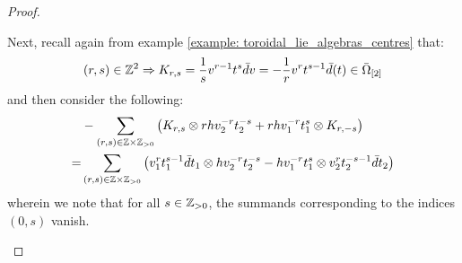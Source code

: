 \begin{proof}
\begin{enumerate}
                    Next, recall again from example \ref{example: toroidal_lie_algebras_centres} that:
                        $$(r, s) \in \mathbb{Z}^2 \Rightarrow K_{r, s} = \frac1s v^{r - 1} t^s \bar{d}v = -\frac1r v^r t^{s - 1} \bar{d}(t) \in \bar{\Omega}_{[2]}$$
                    and then consider the following:
                        $$
                            \begin{aligned}
                                & -\sum_{(r, s) \in \Z \x \Z_{> 0}} \left( K_{r, s} \tensor r h v_2^{-r} t_2^{-s} + r h v_1^{-r} t_1^s \tensor K_{r, -s} \right)
                                \\
                                = & \sum_{(r, s) \in \Z \x \Z_{> 0}} \left( v_1^r t_1^{s - 1} \bar{d}t_1 \tensor h v_2^{-r} t_2^{-s} - h v_1^{-r} t_1^s \tensor v_2^r t_2^{-s - 1} \bar{d}t_2 \right)
                            \end{aligned}
                        $$
                    wherein we note that for all $s \in \mathbb{Z}_{> 0}$, the summands corresponding to the indices $(0, s)$ vanish.


\end{enumerate}
\end{proof}
